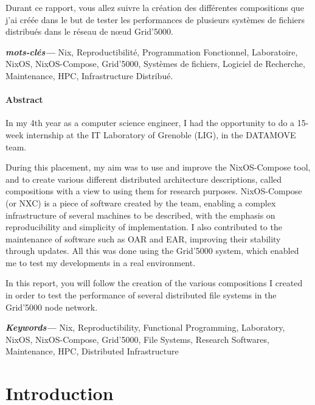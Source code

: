 \documentclass[a4paper,french,12pt, titlepage]{article}
\newcommand{\paragraphnewline}[1]{\hypertarget{par#1}{\paragraph{#1}\mbox{}}}
\begin{document}
Durant ce rapport, vous allez suivre la création des différentes
compositions que j'ai créée dans le but de tester les performances de
plusieurs systèmes de fichiers distribués dans le réseau de nœud
Grid'5000.


\textbf{\textit{mots-clés---}} Nix, Reproductibilité, Programmation
Fonctionnel, Laboratoire, NixOS, NixOS-Compose, Grid'5000, Systèmes de
fichiers, Logiciel de Recherche, Maintenance, HPC, Infrastructure
Distribué.

\begin{center}
    \item \paragraphnewline{Abstract}
\end{center}

In my 4th year as a computer science engineer, I had the opportunity to
do a 15-week internship at the IT Laboratory of Grenoble (LIG), in the
DATAMOVE team.\newline

During this placement, my aim was to use and improve the NixOS-Compose
tool, and to create various different distributed architecture
descriptions, called compositions with a view to using them for research
purposes. NixOS-Compose (or NXC) is a piece of software created by the
team, enabling a complex infrastructure of several machines to be
described, with the emphasis on reproducibility and simplicity of
implementation. I also contributed to the maintenance of software such
as OAR and EAR, improving their stability through updates. All this was
done using the Grid'5000 system, which enabled me to test my
developments in a real environment.\newline 

In this report, you will follow the creation of the various compositions
I created in order to test the performance of several distributed file
systems in the Grid'5000 node network.

\textbf{\textit{Keywords---}} Nix, Reproductibility, Functional
Programming, Laboratory, NixOS, NixOS-Compose, Grid'5000, File Systems,
Research Softwares, Maintenance, HPC, Distributed Infrastructure

\newpage

\tableofcontents
\newpage

\listoffigures

\newpage

\hypertarget{introduction}{%
\section{Introduction}\label{introduction}}
\end{document}
